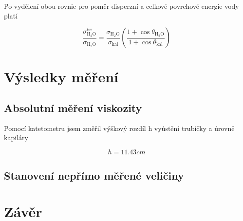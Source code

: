 \documentclass[a4paper,11pt]{article}
\begin{document}
Po vydělení obou rovnic pro poměr disperzní a celkové povrchové energie vody platí

\begin{equation}
\frac{ \sigma^{lw}_{\text{H}_2\text{O}} }{ \sigma_{\text{H}_2\text{O}} } =
\frac{ \sigma_{\text{H}_2\text{O}} }{ \sigma_{\text{kal}} }
( \frac{1 + \cos \theta_{\text{H}_2\text{O}}}{ 1 + \cos \theta_{\text{kal}} } )
\end{equation}

\section{Výsledky měření}

\subsection{Absolutní měření viskozity}

Pomocí katetometru jsem změřil výškový rozdíl h vyústění trubičky a úrovně kapiláry 

\begin{equation}
h = 11.43 cm
\end{equation}

\subsection{Stanovení nepřímo měřené veličiny}

\section{Závěr}
\end{document}
